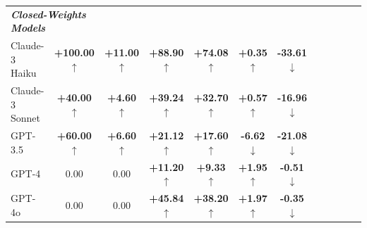 \documentclass{article}
\newcommand{\gooddelta}[1]{\textcolor{mygreen}{\textbf{+#1} $\uparrow$}}
\newcommand{\baddelta}[1]{\textcolor{myred}{\textbf{#1} $\downarrow$}}
\newcommand{\gooddeltaNeg}[1]{\textcolor{mygreen}{\textbf{#1} $\downarrow$}}
\begin{document}
\begin{table}[h]
\begin{tabular}{lccccccccccc}
\midrule
\multicolumn{2}{l}{\textbf{\textit{Closed-Weights Models}}}  \\
Claude-3 Haiku & \gooddelta{100.00} & \gooddelta{11.00} & \gooddelta{88.90} & \gooddelta{74.08} & \gooddelta{0.35} & \gooddeltaNeg{-33.61} \\
Claude-3 Sonnet & \gooddelta{40.00} & \gooddelta{4.60} & \gooddelta{39.24} & \gooddelta{32.70} & \gooddelta{0.57} & \gooddeltaNeg{-16.96} \\
GPT-3.5 & \gooddelta{60.00} & \gooddelta{6.60} & \gooddelta{21.12} & \gooddelta{17.60} & \baddelta{-6.62} & \gooddeltaNeg{-21.08} \\
GPT-4 & {0.00} & {0.00} & \gooddelta{11.20} & \gooddelta{9.33} & \gooddelta{1.95} & \gooddeltaNeg{-0.51} \\
GPT-4o & {0.00} & {0.00} & \gooddelta{45.84} & \gooddelta{38.20} & \gooddelta{1.97} & \gooddeltaNeg{-0.35} \\
\midrule
\end{tabular}
\end{table}
\end{document}
